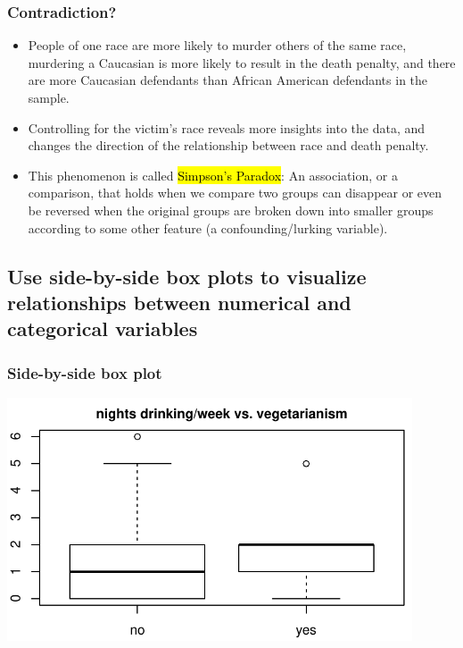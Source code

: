 \documentclass[11pt,containsverbatim,handout,xcolor=xelatex,dvipsnames,table]{beamer}
\begin{document}

\begin{frame}
\frametitle{Contradiction?}

\begin{itemize}

\item People of one race are more likely to murder others of the same race, murdering a Caucasian is more likely to result in the death penalty, and there are more Caucasian defendants than African American defendants in the sample.

\pause

\item Controlling for the victim's race reveals more insights into the data, and changes the direction of the relationship between race and death penalty.

\pause

\item This phenomenon is called \hl{Simpson's Paradox}: An association, or a comparison, that holds when we compare two groups can disappear or even be reversed when the original groups are broken down into smaller groups according to some other feature (a confounding/lurking variable).

\end{itemize}


\end{frame}


\subsection{Use side-by-side box plots to visualize relationships between numerical and categorical variables}
\label{mi7}


\begin{frame}[fragile]
\frametitle{Side-by-side box plot}


\begin{center}
\includegraphics[width=0.9\textwidth]{figures/survey/box_drinks_veg}
\end{center}

\end{frame}
\end{document}
